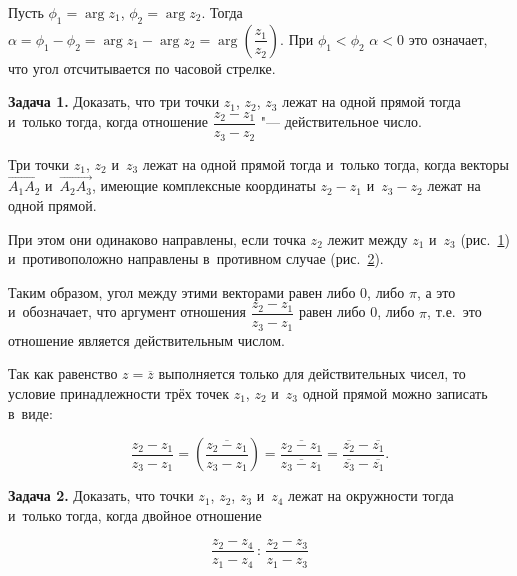 Пусть $\phi_{1} = \arg z_{1}$, $\phi_{2} = \arg z_{2}$.
Тогда
$\alpha = \phi_{1} - \phi_{2} = \arg z_{1} - \arg z_{2} =
\arg \left( \dfrac{z_{1}}{z_{2}} \right)$.
При $\phi_{1} < \phi_{2}$ $\alpha < 0$ это означает, что угол отсчитывается
по часовой стрелке.

\textbf{Задача 1.}\label{ex:7_2_1}  Доказать, что три точки
$z_{1}$, $z_{2}$, $z_{3}$ лежат на одной прямой тогда и~только тогда,
когда отношение
$\dfrac{z_{2} - z_{1}}{z_{3} - z_{2}}$ "--- действительное число.

Три точки $z_{1}$, $z_{2}$ и~$z_{3}$ лежат на одной прямой тогда
и~только тогда, когда векторы
$\overrightarrow{A_{1}A_{2}}$ и~$\overrightarrow{A_{2}A_{3}}$, имеющие
комплексные координаты $z_{2} - z_{1}$ и~$z_{3} - z_{2}$ лежат на одной прямой.

При этом они одинаково направлены, если точка $z_{2}$ лежит между
$z_{1}$ и~$z_{3}$ (рис.\ \ref{fig:7_2_12}) и~противоположно направлены
в~противном случае (рис.\ \ref{fig:7_2_13}).

\begin{figure}\label{fig:7_2_12}
\end{figure}

\begin{figure}\label{fig:7_2_13}
\end{figure}

\noindent
Таким образом, угол между этими векторами равен либо 0, либо $\pi$,
а это и~обозначает, что аргумент отношения $\dfrac{z_{2}-z_{1}}{z_{3}-z_{1}}$
равен либо 0, либо $\pi$, т.е.\ это отношение является действительным числом.

Так как равенство $z = \overline{z}$ выполняется только для действительных
чисел, то условие принадлежности трёх точек $z_{1}$, $z_{2}$ и~$z_{3}$
одной прямой можно записать в~виде:

\begin{equation}\label{eq:7_2_19}
\dfrac{z_{2}-z_{1}}{z_{3}-z_{1}} =
\left( \overline{\dfrac{z_{2}-z_{1}}{z_{3}-z_{1}}} \right) =
\dfrac{\overline{z_{2}-z_{1}}}{\overline{z_{3}-z_{1}}} =
\dfrac{\overline{z_{2}}-\overline{z_{1}}}{\overline{z_{3}}-\overline{z_{1}}}.
\end{equation}

\textbf{Задача 2.}\label{ex:7_2_2} Доказать, что точки
$z_{1}$, $z_{2}$, $z_{3}$ и~$z_{4}$ лежат на окружности тогда и~только
тогда, когда двойное отношение

\begin{equation*}
\dfrac{z_{2} - z_{4}}{z_{1} - z_{4}}
\, : \,
\dfrac{z_{2} - z_{3}}{z_{1} - z_{3}}
\end{equation*}

